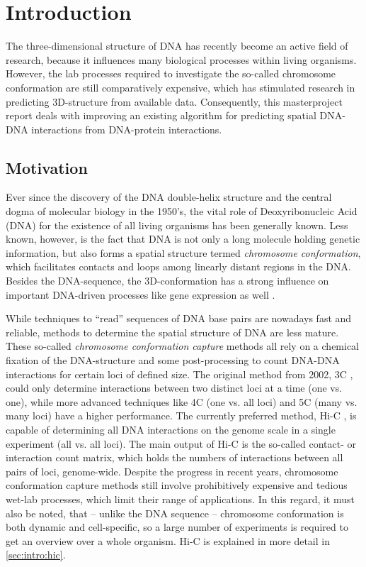 \section{Introduction} \label{sec:intro}
The three-dimensional structure of DNA has recently become an active field of research,
because it influences many biological processes within living organisms.
However, the lab processes required to investigate the so-called chromosome conformation
are still comparatively expensive, which has stimulated research in predicting 
3D-structure from available data.
Consequently, this masterproject report deals with improving an existing algorithm
for predicting spatial DNA-DNA interactions from DNA-protein interactions.

\subsection{Motivation}
Ever since the discovery of the DNA double-helix structure \cite{Watson1953} and the central dogma of molecular biology \cite{Crick1958} in the 1950's,
the vital role of Deoxyribonucleic Acid (DNA) for the existence of all living organisms has been generally known.
Less known, however, is the fact that DNA is not only a long molecule holding genetic information, 
but also forms a spatial structure termed \emph{chromosome conformation}, 
which facilitates contacts and loops among linearly distant regions in the DNA. 
Besides the DNA-sequence, the 3D-conformation has a strong influence on important DNA-driven processes
like gene expression as well \cite{Pombo2015,Bonev2016}.

While techniques to ``read'' sequences of DNA base pairs are nowadays fast and reliable, 
methods to determine the spatial structure of DNA are less mature.
These so-called \emph{chromosome conformation capture} methods all rely on a chemical fixation 
of the DNA-structure and some post-processing to count DNA-DNA interactions for certain loci of defined size. 
The original method from 2002, 3C \cite{Dekker2002}, could only determine interactions 
between two distinct loci at a time (one vs. one), while more advanced techniques like
4C \cite{Simonis2006} (one vs. all loci) and 5C \cite{Dostie2006} (many vs. many loci) 
 have a higher performance.
The currently preferred method, Hi-C \cite{LiebermanAiden2009, Berkum2010},
is capable of determining all DNA interactions on the genome scale in a single experiment 
(all vs. all loci). 
The main output of Hi-C is the so-called contact- or interaction count matrix, 
which holds the numbers of interactions between all pairs of loci, genome-wide.
Despite the progress in recent years, chromosome conformation capture methods still involve prohibitively expensive and 
tedious wet-lab processes, which limit their range of applications. 
In this regard, it must also be noted, that -- unlike the DNA sequence -- 
chromosome conformation is both dynamic and cell-specific, 
so a large number of experiments is required to get an overview over a whole organism.
Hi-C is explained in more detail in \,\autoref{sec:intro:hic}.

